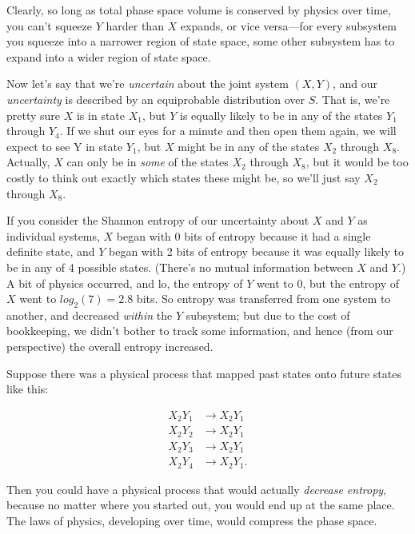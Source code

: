 {
 Clearly, so long as total phase space volume is conserved by
physics over time, you can't squeeze $Y$ harder than $X$
expands, or vice versa---for every subsystem you squeeze into a
narrower region of state space, some other subsystem has to expand into
a wider region of state space.}

{
 Now let's say that we're
\textit{uncertain} about the joint system $(X,Y)$, and our
\textit{uncertainty} is described by an equiprobable distribution over
$S$. That is, we're pretty sure $X$ is in state
$X_{1}$, but $Y$ is equally likely to be in any of the states
$Y_{1}$ through $Y_{4}$. If we shut our eyes for
a minute and then open them again, we will expect to see Y in state
$Y_{1}$, but $X$ might be in any of the states
$X_{2}$ through $X_{8}$. Actually, $X$ can only be
in \textit{some} of the states $X_{2}$ through
$X_{8}$, but it would be too costly to think out exactly
which states these might be, so we'll just say
$X_{2}$ through $X_{8}$.}

{
 If you consider the Shannon entropy of our uncertainty about $X$ and
$Y$ as individual systems, $X$ began with 0 bits of entropy because it had
a single definite state, and $Y$ began with 2 bits of entropy because it
was equally likely to be in any of 4 possible states.
(There's no mutual information between $X$ and $Y$.) A bit
of physics occurred, and lo, the entropy of $Y$ went to 0, but the
entropy of $X$ went to $log_{2}(7) = 2.8$ bits. So entropy was
transferred from one system to another, and decreased \textit{within}
the $Y$ subsystem; but due to the cost of bookkeeping, we
didn't bother to track some information, and hence
(from our perspective) the overall entropy increased.}

{
 Suppose there was a physical process that mapped past states onto
future states like this:}

\begin{align*}
 X_{2}Y_{1} &\rightarrow X_{2}Y_{1} \\
 X_{2}Y_{2} &\rightarrow X_{2}Y_{1} \\
 X_{2}Y_{3} &\rightarrow X_{2}Y_{1} \\
 X_{2}Y_{4} &\rightarrow X_{2}Y_{1}.
\end{align*}

{
 Then you could have a physical process that would actually
\textit{decrease entropy}, because no matter where you started out, you
would end up at the same place. The laws of physics, developing over
time, would compress the phase space.}


